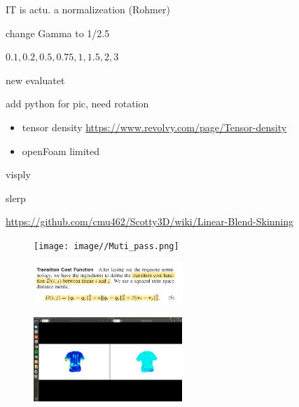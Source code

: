 \documentclass{beamer}
\begin{document}
\begin{frame}
IT is actu. a normalizeation (Rohmer)

change Gamma to 1/2.5

$0.1, 0.2, 0.5, 0.75,1, 1.5, 2, 3$ 
\end{frame}

\begin{frame}
new evaluatet

add python for pic, need rotation 

\begin{itemize}
\item tensor density
\url{https://www.revolvy.com/page/Tensor-density}
\item openFoam limited
\end{itemize}
\end{frame}
\begin{frame}
visply

slerp

\url{https://github.com/cmu462/Scotty3D/wiki/Linear-Blend-Skinning}

\begin{figure}
\centering
\texttt{[image: image//Muti\_pass.png]}
\end{figure}

\begin{figure}
\centering
\includegraphics[width=0.5\textwidth]{image//transition_cost_function.PNG}
\end{figure}
\end{frame}

\begin{frame}
\begin{figure}
\centering
\includegraphics[width=0.5\textwidth]{image//compare.png}
\end{figure}
\end{frame}
\end{document}
